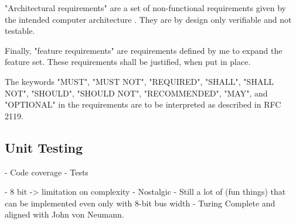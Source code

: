 "Architectural requirements" are a set of non-functional requirements given by the intended computer architecture \cite{vonneuman1945a}. They are by design only verifiable and not testable. 

Finally, "feature requirements" are requirements defined by me to expand the feature set. These requirements shall be justified, when put in place. 

\newtheorem{turing-requirement}{Turing Req.}[subsection]
\newtheorem{arch-requirement}{Arch. Req.}[subsection]
\newtheorem{feat-requirement}{Feat. Req.}[subsection]

The keywords "MUST", "MUST NOT", "REQUIRED", "SHALL", "SHALL NOT", "SHOULD", "SHOULD NOT", "RECOMMENDED",  "MAY", and "OPTIONAL" in the requirements are to be interpreted as described in RFC 2119.

\subsection{Unit Testing}
- Code coverage
- Tests



- 8 bit -> limitation on complexity
- Nostalgic
- Still a lot of (fun things) that can be implemented even only with 8-bit bus width
- Turing Complete and aligned with John von Neumann.




